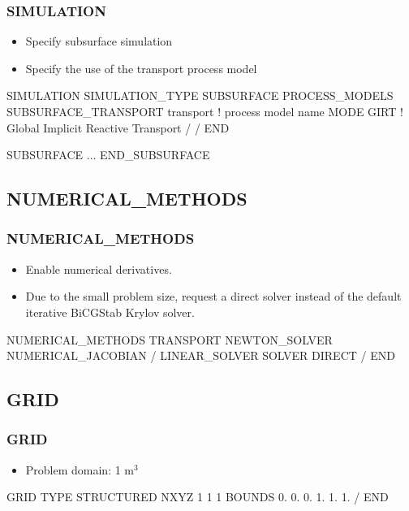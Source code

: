 \documentclass{beamer}
\newcommand\redcomment[1]{{{\color{red} #1}}}
\newcommand\bluecomment[1]{{{\color{blue} #1}}}
\begin{document}
\begin{frame}[fragile]\frametitle{SIMULATION}

\begin{itemize}
  \item Specify subsurface simulation
  \item Specify the use of the transport process model
\end{itemize}


\begin{semiverbatim}

SIMULATION
  SIMULATION_TYPE SUBSURFACE
  PROCESS_MODELS
    SUBSURFACE_TRANSPORT transport \bluecomment{! process model name}
      MODE GIRT   \bluecomment{! \redcomment{G}lobal \redcomment{I}mplicit \redcomment{R}eactive \redcomment{T}ransport}
    /
  /
END

SUBSURFACE
  ...
END_SUBSURFACE
\end{semiverbatim}

\end{frame}

\subsection{NUMERICAL\_METHODS}

\begin{frame}[fragile]\frametitle{NUMERICAL\_METHODS}

\begin{itemize}
\item Enable numerical derivatives.
\item Due to the small problem size, request a direct solver instead of the default iterative BiCGStab Krylov solver.
\end{itemize}

\begin{semiverbatim}

NUMERICAL_METHODS TRANSPORT
  NEWTON_SOLVER
    NUMERICAL_JACOBIAN
  /
  LINEAR_SOLVER
    SOLVER DIRECT
  /
END

\end{semiverbatim}

\end{frame}

\subsection{GRID}
\begin{frame}\frametitle{GRID}

\begin{itemize}
  \item Problem domain: 1 m$^3$
\end{itemize}

\begin{semiverbatim}

GRID
  TYPE STRUCTURED
  NXYZ 1 1 1
  BOUNDS
    0. 0. 0.
    1. 1. 1.
  /
END
\end{semiverbatim}

\end{frame}
\end{document}
